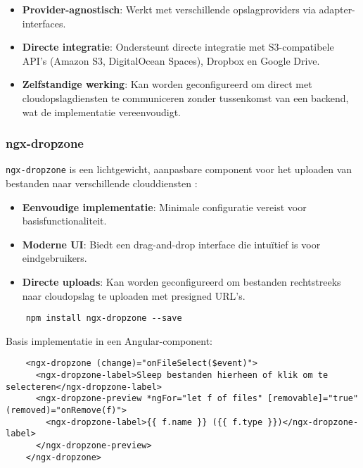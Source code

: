 \begin{itemize}
  \item \textbf{Provider-agnostisch}: Werkt met verschillende opslagproviders via adapter-interfaces.
  \item \textbf{Directe integratie}: Ondersteunt directe integratie met S3-compatibele API's (Amazon S3, DigitalOcean Spaces), Dropbox en Google Drive.
  \item \textbf{Zelfstandige werking}: Kan worden geconfigureerd om direct met cloudopslagdiensten te communiceren zonder tussenkomst van een backend, wat de implementatie vereenvoudigt.
\end{itemize}

\subsubsection{ngx-dropzone}
\texttt{ngx-dropzone} is een lichtgewicht, aanpasbare component voor het uploaden van bestanden naar verschillende clouddiensten \autocite{ngx_dropzone}:

\begin{itemize}
  \item \textbf{Eenvoudige implementatie}: Minimale configuratie vereist voor basisfunctionaliteit.
  \item \textbf{Moderne UI}: Biedt een drag-and-drop interface die intuïtief is voor eindgebruikers.
  \item \textbf{Directe uploads}: Kan worden geconfigureerd om bestanden rechtstreeks naar cloudopslag te uploaden met presigned URL's.
\end{itemize}

\begin{listing}
  \begin{verbatim}
    npm install ngx-dropzone --save
  \end{verbatim}
\end{listing}

Basis implementatie in een Angular-component:

\begin{listing}
  \begin{verbatim}
    <ngx-dropzone (change)="onFileSelect($event)">
      <ngx-dropzone-label>Sleep bestanden hierheen of klik om te selecteren</ngx-dropzone-label>
      <ngx-dropzone-preview *ngFor="let f of files" [removable]="true" (removed)="onRemove(f)">
        <ngx-dropzone-label>{{ f.name }} ({{ f.type }})</ngx-dropzone-label>
      </ngx-dropzone-preview>
    </ngx-dropzone>
  \end{verbatim}
\end{listing}

